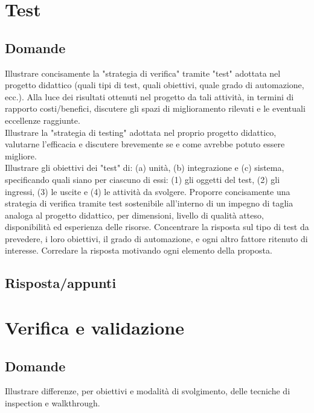 \section{Test}

\subsection*{Domande}
Illustrare concisamente la "strategia di verifica" tramite "test" adottata nel progetto didattico (quali tipi di test, quali obiettivi, quale grado di automazione, ecc.). 
Alla luce dei risultati ottenuti nel progetto da tali attività, in termini di rapporto costi/benefici, discutere gli spazi di miglioramento rilevati e le eventuali eccellenze raggiunte.\\

Illustrare la "strategia di testing" adottata nel proprio progetto didattico, valutarne l'efficacia e discutere brevemente se e come avrebbe potuto essere migliore.\\

Illustrare gli obiettivi dei "test" di: (a) unità, (b) integrazione e (c) sistema, specificando quali siano per ciascuno di essi: (1) gli oggetti del test, (2) gli ingressi, (3) le uscite e (4) le attività da svolgere.
Proporre concisamente una strategia di verifica tramite test sostenibile all'interno di un impegno di taglia analoga al progetto didattico, per dimensioni, livello di qualità atteso, disponibilità ed esperienza delle risorse.
Concentrare la risposta sul tipo di test da prevedere, i loro obiettivi, il grado di automazione, e ogni altro fattore ritenuto di interesse. 
Corredare la risposta motivando ogni elemento della proposta.

\subsection*{Risposta/appunti}



\section{Verifica e validazione}

\subsection*{Domande}

Illustrare differenze, per obiettivi e modalità di svolgimento, delle tecniche di inspection e walkthrough.\\

